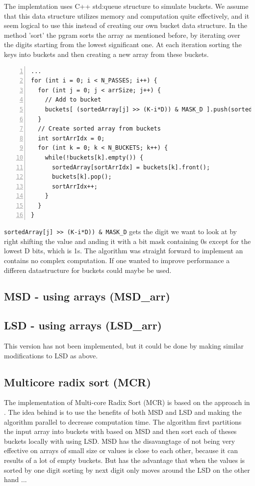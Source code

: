 The implemtation uses C++ std:queue structure to simulate buckets. We assume that this data structure utilizes memory and computation quite effectively, and it seem logical to use this instead of creating our own bucket data structure.
In the method 'sort' the pgram sorts the array as mentioned before, by iterating over the digits starting from the lowest significant one. At each iteration sorting the keys into buckets and then creating a new array from these buckets.
\begin{lstlisting}[numbers=left]
...
for (int i = 0; i < N_PASSES; i++) {
  for (int j = 0; j < arrSize; j++) {
    // Add to bucket
    buckets[ (sortedArray[j] >> (K-i*D)) & MASK_D ].push(sortedArray[j]);
  }
  // Create sorted array from buckets
  int sortArrIdx = 0;
  for (int k = 0; k < N_BUCKETS; k++) {
    while(!buckets[k].empty()) {
      sortedArray[sortArrIdx] = buckets[k].front();
      buckets[k].pop();
      sortArrIdx++;
    }
  }
}
\end{lstlisting}
\verb!sortedArray[j] >> (K-i*D)) & MASK_D! gets the digit we want to look at by right shifting the value and anding it with a bit mask containing 0s except for the lowest D bits, which is 1s.
The algorithm was straight forward to implement an contains no complex computation. If one wanted to improve performance a differen datastructure for buckets could maybe be used.


\subsection{MSD - using arrays (MSD\_arr)}


\subsection{LSD - using arrays (LSD\_arr)}
This version has not been implemented, but it could be done by making similar modifications to LSD as above.


\subsection{Multicore radix sort (MCR) \citep{radixSort}}
The implementation of Multi-core Radix Sort (MCR) is based on the approach in \citep{radixSort}. The idea behind is to use the benefits of both MSD and LSD and making the algorithm parallel to decrease computation time. 
The algorithm first partitions the input array into buckets with based on MSD and then sort each of theses buckets locally with using LSD.  
MSD has the disavangtage of not being very effective on arrays of small size or values is close to each other, because it can results of a lot of empty buckets. 
But has the advantage that when the values is sorted by one digit sorting by next digit only moves around the 
LSD on the other hand ...

